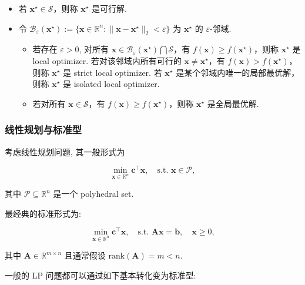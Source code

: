 \documentclass[11pt,UTF8,scheme=plain,fontset=fandol,linespread=1.3]{ctexart}
\numberwithin{figure}{section}
\begin{document}
\begin{itemize}
\item {}若 $\bm{x}^\star \in \mathcal{S}$，则称 $\bm{x}^\star$ 是可行解.


\item {}令 $\mathcal{B}_\varepsilon(\bm{x}^\star) := \{\bm{x} \in \mathbb{R}^n: \|\bm{x}-\bm{x}^\star\|_2 < \varepsilon\}$ 为 $\bm{x}^\star$ 的 $\varepsilon$-邻域.

\begin{itemize}
\item {}若存在 $\varepsilon > 0$, 对所有 $\bm{x} \in \mathcal{B}_\varepsilon(\bm{x}^\star) \bigcap \mathcal{S}$，有 $f(\bm{x}) \geq f(\bm{x}^\star)$，则称 $\bm{x}^\star$ 是 local optimizer. 若对该邻域内所有可行的 $\bm{x} \neq \bm{x}^\star$，有 $f(\bm{x}) > f(\bm{x}^\star)$，则称 $\bm{x}^\star$ 是 strict local optimizer. 若 $\bm{x}^\star$ 是某个邻域内唯一的局部最优解，则称 $\bm{x}^\star$ 是 isolated local optimizer.


\item {}若对所有 $\bm{x} \in \mathcal{S}$，有 $f(\bm{x}) \geq f(\bm{x}^\star)$，则称 $\bm{x}^\star$ 是全局最优解.


\end{itemize}


\end{itemize}

\subsubsection{线性规划与标准型}

考虑线性规划问题, 其一般形式为

\[
\min_{\bm{x} \in \mathbb{R}^n} \bm{c}^\top \bm{x}, \quad \text{s.t. } \bm{x} \in \mathcal{P},
\]

其中 $\mathcal{P} \subseteq \mathbb{R}^n$ 是一个 polyhedral set.

最经典的标准形式为:

\[
\min_{\bm{x} \in \mathbb{R}^n} \bm{c}^\top \bm{x}, \quad \text{s.t. } \bm{A}\bm{x} = \bm{b}, \quad \bm{x} \geq 0,
\]

其中 $\bm{A} \in \mathbb{R}^{m \times n}$ 且通常假设 $\text{rank}(\bm{A}) = m < n$.

一般的 LP 问题都可以通过如下基本转化变为标准型:
\end{document}
